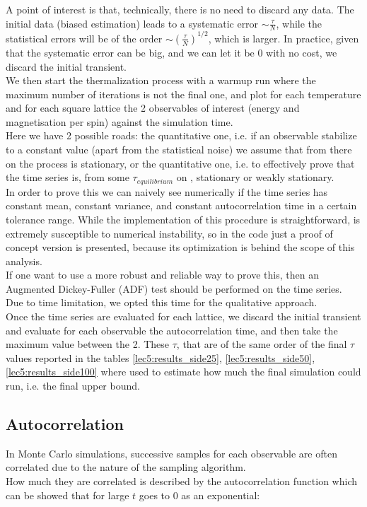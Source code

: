 A point of interest is that, technically, there is no need to discard any data. The initial data (biased estimation) leads to a systematic error $\sim \frac{\tau}{N}$,
while the statistical errors will be of the order $\sim (\frac{\tau}{N})^{1/2}$, which is larger. In practice, given that the systematic error can be big, 
and we can let it be 0 with no cost, we discard the initial transient. \\ 

We then start the thermalization process with a warmup run where the maximum number of iterations is not the final one, and plot for each temperature and for 
each square lattice the 2 observables of interest (energy and magnetisation per spin) against the simulation time. \\

Here we have 2 possible roads: the quantitative one, i.e. if an observable stabilize to a constant value (apart from the statistical noise) 
we assume that from there on the process is stationary, or the quantitative one, i.e. to effectively prove that the time series is, from some $\tau_{equilibrium}$ on ,
stationary or weakly stationary. \\
In order to prove this we can naively see numerically if the time series has constant mean, constant variance, and constant autocorrelation time in a certain tolerance 
range. While the implementation of this procedure is straightforward, is extremely susceptible to numerical instability, 
so in the code just a proof of concept version is presented, because its optimization is behind the scope of this analysis. \\
If one want to use a more robust and reliable way to prove this, then an Augmented Dickey-Fuller (ADF) test should be performed on the time series. \\
Due to time limitation, we opted this time for the qualitative approach. \\

Once the time series are evaluated for each lattice, we discard the initial transient and evaluate for each observable the autocorrelation time, and then take the maximum value between the 2.
These $\tau$, that are of the same order of the final $\tau$ values reported in the tables \ref{lec5:results_side25}, \ref{lec5:results_side50}, \ref{lec5:results_side100} where used 
to estimate how much the final simulation could run, i.e. the final upper bound. 

\subsection{Autocorrelation} In Monte Carlo simulations, successive samples for each observable are often correlated due to the nature of the sampling algorithm. \\
How much they are correlated is described by the autocorrelation function which can be showed that for large $t$ goes to 0 as an exponential:

